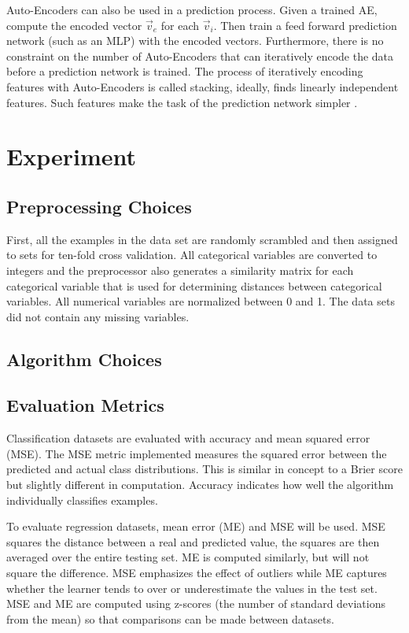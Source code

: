 \documentclass[twoside,11pt]{article}
\begin{document}
	Auto-Encoders can also be used in a prediction process. Given a trained AE, compute the encoded vector  $\vec{v}_e$ for each $\vec{v}_i$. 
	Then train a feed forward prediction network (such as an MLP) with the encoded vectors. 
	Furthermore, there is no constraint on the number of Auto-Encoders that can iteratively encode the data before a prediction network is trained. 
	The process of iteratively encoding features with Auto-Encoders is called stacking, ideally, finds linearly independent features. Such features make the task of the prediction network simpler \citep{sparsity}.
		
\section{Experiment}

\subsection{Preprocessing Choices}

	First, all the examples in the data set are randomly scrambled and then assigned to sets for ten-fold cross validation. 
	All categorical variables are converted to integers 
	and the preprocessor also generates a similarity matrix for each categorical variable that is used for determining distances between categorical variables. 
	All numerical variables are normalized between 0 and 1. 
	The data sets did not contain any missing variables.

\subsection{Algorithm Choices}
	

\subsection{Evaluation Metrics}

	Classification datasets are evaluated with accuracy and mean squared error (MSE). 
	The MSE metric implemented measures the squared error between the predicted and actual class distributions. 
	This is similar in concept to a Brier score but slightly different in computation. Accuracy indicates how well the algorithm individually classifies examples.
	
	To evaluate regression datasets, mean error (ME) and MSE will be used. MSE squares the distance between a real and predicted value, the squares are then averaged over the entire testing set. 
	ME is computed similarly, but will not square the difference. MSE emphasizes the effect of outliers while ME captures whether the learner tends to over or underestimate the values in the test set. 
	MSE and ME are computed using z-scores (the number of standard deviations from the mean) so that comparisons can be made between datasets.
\end{document}
